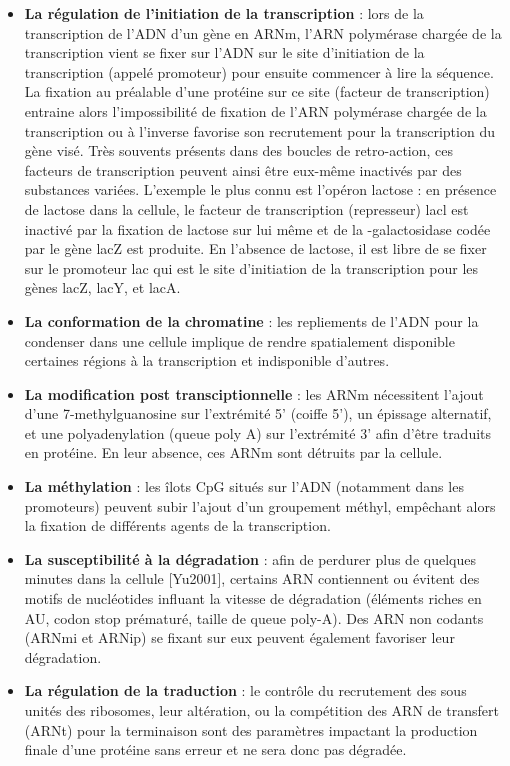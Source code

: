\begin{itemize}
    \item \textbf{La régulation de l'initiation de la transcription} : lors de la transcription de l'ADN d'un gène en ARNm, l'ARN polymérase chargée de la transcription vient se fixer sur l'ADN sur le site d'initiation de la transcription (appelé promoteur) pour ensuite commencer à lire la séquence. La fixation au préalable d'une protéine sur ce site (facteur de transcription) entraine alors l'impossibilité de fixation de l'ARN polymérase chargée de la transcription ou à l'inverse favorise son recrutement pour la transcription du gène visé. Très souvents présents dans des boucles de retro-action, ces facteurs de transcription peuvent ainsi être eux-même inactivés par des substances variées. L'exemple le plus connu est l'opéron lactose : en présence de lactose dans la cellule, le facteur de transcription (represseur) lacl est inactivé par la fixation de lactose sur lui même et de la \beta-galactosidase codée par le gène lacZ est produite. En l'absence de lactose, il est libre de se fixer sur le promoteur lac qui est le site d'initiation de la transcription pour les gènes lacZ, lacY, et lacA.
    \item \textbf{La conformation de la chromatine} : les repliements de l'ADN pour la condenser dans une cellule implique de rendre spatialement disponible certaines régions à la transcription et indisponible d'autres.
    \item \textbf{La modification post transciptionnelle} : les ARNm nécessitent l'ajout d'une 7-methylguanosine sur l'extrémité 5' (coiffe 5'), un épissage alternatif, et une polyadenylation (queue poly A) sur l'extrémité 3' afin d'être traduits en protéine. En leur absence, ces ARNm sont détruits par la cellule.
    \item \textbf{La méthylation} : les îlots CpG situés sur l'ADN (notamment dans les promoteurs) peuvent subir l'ajout d'un groupement méthyl, empêchant alors la fixation de différents agents de la transcription.
    \item \textbf{La susceptibilité à la dégradation} : afin de perdurer plus de quelques minutes dans la cellule [Yu2001], certains ARN contiennent ou évitent des motifs de nucléotides influant la vitesse de dégradation (éléments riches en AU, codon stop prématuré, taille de queue poly-A). Des ARN non codants (ARNmi et ARNip) se fixant sur eux peuvent également favoriser leur dégradation.
    \item \textbf{La régulation de la traduction} : le contrôle du recrutement des sous unités des ribosomes, leur altération, ou la compétition des ARN de transfert (ARNt) pour la terminaison sont des paramètres impactant la production finale d'une protéine sans erreur et ne sera donc pas dégradée.
\end{itemize}


